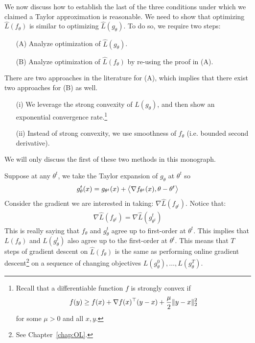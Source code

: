 We now discuss how to establish the last of the three conditions under which we claimed a Taylor approximation is reasonable. We need to show that  optimizing $\hat{L} (f_\theta)$ is similar to optimizing $\hat{L}(g_\theta)$. To do so, we require two steps:
\begin{enumerate}[label=\alph*]
    \item[(A)] Analyze optimization of $\hat{L}(g_\theta)$.
    \item[(B)] Analyze optimization of $\hat{L}(f_\theta)$ by re-using the proof in (A).
\end{enumerate}
There are two approaches in the literature for (A), which implies that there exist two approaches for (B) as well. 
\begin{enumerate}
    \item[(i)] We leverage the strong convexity of $\hat{L} (g_\theta)$, and then show an exponential convergence rate.\footnote{Recall that a differentiable function $f$ is strongly convex if 
    \begin{align} 
        f(y) \geq f(x) + \nabla f(x)^\top (y-x) + \frac{\mu}{2} \|y-x\|_2^2
    \end{align} for some $\mu>0$ and all $x,y$.} 
    \item[(ii)] Instead of strong convexity, we use smoothness of $f_\theta$ (i.e. bounded second derivative). 
\end{enumerate}
We will only discuss the first of these two methods in this monograph.

\begin{remark} 
Suppose at any $\theta^t$, we take the Taylor expansion of $g_\theta$ at $\theta^t$ so 
\begin{align} 
    g_\theta^t(x) = g_{\theta^t} (x) + \left\langle \nabla f_{\theta^t} (x),\theta-\theta^t \right\rangle 
\end{align} 
Consider the gradient we are interested in taking: $\nabla \hat{L} ( f_{\theta^t})$. Notice that: \begin{align} 
    \nabla \hat{L} ( f_{\theta^t}) = \nabla \hat{L} ( g_{\theta^t}^t)
\end{align} 
This is really saying that $f_\theta$ and $g_\theta^t$ agree up to first-order at $\theta^t$. This implies that $L(f_\theta)$ and $L(g_\theta^t)$ also agree up to the first-order at $\theta^t$. This means that $T$ steps of gradient descent on $\hat{L}(f_\theta)$ is the same as performing online gradient descent\footnote{See Chapter~\ref{chap:OL}.} on a sequence of changing objectives $L(g_\theta^0), \ldots, L(g_\theta^T)$.
\end{remark} 